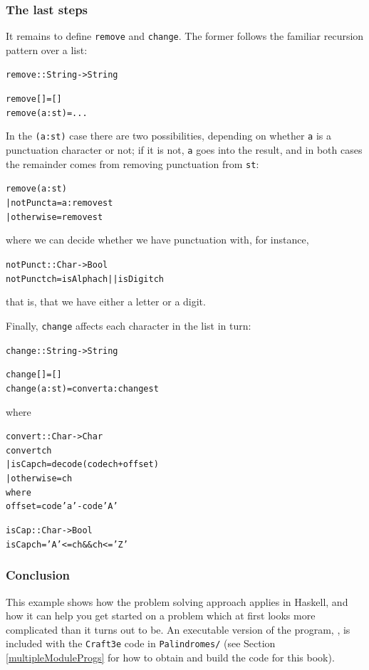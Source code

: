 \subsubsection*{The last steps}

It remains to define \texttt{remove} and \texttt{change}. The former follows the familiar recursion pattern over a list:
\begin{alltt}
remove :: String -> String

remove []     = []
remove (a:st) = ...
\end{alltt}
In the \texttt{(a:st)} case there are two possibilities, depending on whether \texttt{a} is a punctuation character or not; if it is not, \texttt{a} goes into the result, and in both cases the remainder comes from removing punctuation from \texttt{st}:
\begin{alltt}
remove (a:st)
  | notPunct a = a : remove st
  | otherwise  =     remove st
\end{alltt}
where we can decide whether we have punctuation with, for instance,
\begin{alltt}
notPunct :: Char -> Bool
notPunct ch = isAlpha ch || isDigit ch
\end{alltt}
that is, that we have either a letter or a digit.

Finally, \texttt{change} affects each character in the list in turn:
\begin{alltt}
change :: String -> String

change []     = []
change (a:st) = convert a : change st
\end{alltt}
where
\begin{alltt}
convert :: Char -> Char
convert ch
  | isCap ch  = decode (code ch + offset)
  | otherwise = ch
    where
    offset = code 'a' - code 'A'

isCap :: Char -> Bool
isCap ch = 'A' <= ch && ch <= 'Z'
\end{alltt}

\subsubsection*{Conclusion}

This example shows how the problem solving approach applies in Haskell, and how it can help you get started on a problem which at first looks more complicated than it turns out to be. An executable version of the program, , is included with the \texttt{Craft3e} code in \texttt{Palindromes/} (see Section \ref{multipleModuleProgs} for how to obtain and build the code for this book).

